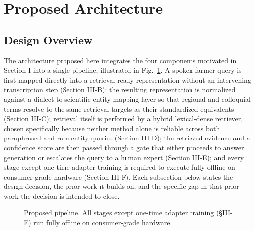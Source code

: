 \documentclass[conference]{IEEEtran}
\begin{document}
\section{Proposed Architecture}

\subsection{Design Overview}

The architecture proposed here integrates the four components motivated in Section I into a single pipeline, illustrated in Fig.~\ref{fig:architecture}. A spoken farmer query is first mapped directly into a retrieval-ready representation without an intervening transcription step (Section III-B); the resulting representation is normalized against a dialect-to-scientific-entity mapping layer so that regional and colloquial terms resolve to the same retrieval targets as their standardized equivalents (Section III-C); retrieval itself is performed by a hybrid lexical-dense retriever, chosen specifically because neither method alone is reliable across both paraphrased and rare-entity queries (Section III-D); the retrieved evidence and a confidence score are then passed through a gate that either proceeds to answer generation or escalates the query to a human expert (Section III-E); and every stage except one-time adapter training is required to execute fully offline on consumer-grade hardware (Section III-F). Each subsection below states the design decision, the prior work it builds on, and the specific gap in that prior work the decision is intended to close.

\begin{figure}[t]
\centering
{}
\caption{Proposed pipeline. All stages except one-time adapter training (\S III-F) run fully offline on consumer-grade hardware.}
\label{fig:architecture}
\end{figure}
\end{document}
